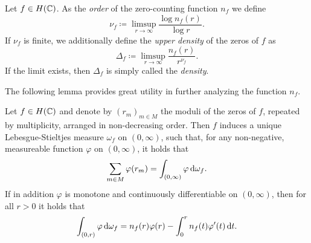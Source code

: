 \begin{definition} \label{def:order-density-zero-counting}
    Let $f \in H(\mathbb{C})$. As the \emph{order} of the zero-counting function $n_f$ we define
    \begin{equation}
        \nu_f \coloneqq \limsup_{r \to \infty} \frac{\log n_f(r)}{\log r}.
    \end{equation}
    If $\nu_f$ is finite, we additionally define the \emph{upper density} of the zeros of $f$ as
    \begin{equation}
        \Delta_f \coloneqq \limsup_{r \to \infty} \frac{n_f(r)}{r^{\nu_f}}.
    \end{equation}
    If the limit exists, then $\Delta_f$ is simply called the \emph{density}.
\end{definition}

The following lemma provides great utility in further analyzing the function $n_f$.

\begin{lemma} \label{lem:zeros-measure}
    Let $f \in H(\mathbb{C})$ and denote by $(r_m)_{m \in M}$ the moduli of the zeros of $f$, repeated by multiplicity, arranged in non-decreasing order. Then $f$ induces a unique Lebesgue-Stieltjes measure $\omega_f$ on $(0, \infty)$, such that, for any non-negative, measureable function $\varphi$ on $(0, \infty)$, it holds that
    \begin{equation*}
        \sum_{m \in M} \varphi(r_m) = \int_{(0, \infty)} \varphi \mathop{}\!\mathrm{d} \omega_f.
    \end{equation*}
    If in addition $\varphi$ is monotone and continuously differentiable on $(0, \infty)$, then for all $r > 0$ it holds that
    \begin{equation*}
        \int_{(0, r)} \varphi \mathop{}\!\mathrm{d} \omega_f = n_f(r) \varphi(r) - \int_0^r n_f(t) \varphi'(t) \mathop{}\!\mathrm{d} t.
    \end{equation*}
\end{lemma}

